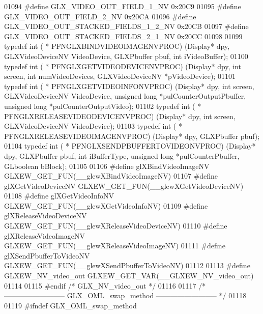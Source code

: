 \begin{DoxyCode}
01094 \textcolor{preprocessor}{#define GLX\_VIDEO\_OUT\_FIELD\_1\_NV 0x20C9}
01095 \textcolor{preprocessor}{#define GLX\_VIDEO\_OUT\_FIELD\_2\_NV 0x20CA}
01096 \textcolor{preprocessor}{#define GLX\_VIDEO\_OUT\_STACKED\_FIELDS\_1\_2\_NV 0x20CB}
01097 \textcolor{preprocessor}{#define GLX\_VIDEO\_OUT\_STACKED\_FIELDS\_2\_1\_NV 0x20CC}
01098 
01099 \textcolor{keyword}{typedef} int ( * PFNGLXBINDVIDEOIMAGENVPROC) (Display* dpy, GLXVideoDeviceNV VideoDevice, GLXPbuffer pbuf, \textcolor{keywordtype}{
      int} iVideoBuffer);
01100 \textcolor{keyword}{typedef} int ( * PFNGLXGETVIDEODEVICENVPROC) (Display* dpy, \textcolor{keywordtype}{int} screen, \textcolor{keywordtype}{int} numVideoDevices, 
      GLXVideoDeviceNV *pVideoDevice);
01101 \textcolor{keyword}{typedef} int ( * PFNGLXGETVIDEOINFONVPROC) (Display* dpy, \textcolor{keywordtype}{int} screen, GLXVideoDeviceNV VideoDevice, \textcolor{keywordtype}{unsigned}
       \textcolor{keywordtype}{long} *pulCounterOutputPbuffer, \textcolor{keywordtype}{unsigned} \textcolor{keywordtype}{long} *pulCounterOutputVideo);
01102 \textcolor{keyword}{typedef} int ( * PFNGLXRELEASEVIDEODEVICENVPROC) (Display* dpy, \textcolor{keywordtype}{int} screen, GLXVideoDeviceNV VideoDevice);
01103 \textcolor{keyword}{typedef} int ( * PFNGLXRELEASEVIDEOIMAGENVPROC) (Display* dpy, GLXPbuffer pbuf);
01104 \textcolor{keyword}{typedef} int ( * PFNGLXSENDPBUFFERTOVIDEONVPROC) (Display* dpy, GLXPbuffer pbuf, \textcolor{keywordtype}{int} 
      iBufferType, \textcolor{keywordtype}{unsigned} \textcolor{keywordtype}{long} *pulCounterPbuffer, GLboolean bBlock);
01105 
01106 \textcolor{preprocessor}{#define glXBindVideoImageNV GLXEW\_GET\_FUN(\_\_glewXBindVideoImageNV)}
01107 \textcolor{preprocessor}{#define glXGetVideoDeviceNV GLXEW\_GET\_FUN(\_\_glewXGetVideoDeviceNV)}
01108 \textcolor{preprocessor}{#define glXGetVideoInfoNV GLXEW\_GET\_FUN(\_\_glewXGetVideoInfoNV)}
01109 \textcolor{preprocessor}{#define glXReleaseVideoDeviceNV GLXEW\_GET\_FUN(\_\_glewXReleaseVideoDeviceNV)}
01110 \textcolor{preprocessor}{#define glXReleaseVideoImageNV GLXEW\_GET\_FUN(\_\_glewXReleaseVideoImageNV)}
01111 \textcolor{preprocessor}{#define glXSendPbufferToVideoNV GLXEW\_GET\_FUN(\_\_glewXSendPbufferToVideoNV)}
01112 
01113 \textcolor{preprocessor}{#define GLXEW\_NV\_video\_out GLXEW\_GET\_VAR(\_\_GLXEW\_NV\_video\_out)}
01114 
01115 \textcolor{preprocessor}{#endif }\textcolor{comment}{/* GLX\_NV\_video\_out */}\textcolor{preprocessor}{}
01116 
01117 \textcolor{comment}{/* -------------------------- GLX\_OML\_swap\_method -------------------------- */}
01118 
01119 \textcolor{preprocessor}{#ifndef GLX\_OML\_swap\_method}

\end{DoxyCode}
